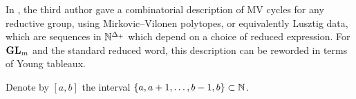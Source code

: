 \documentclass{article} %
\begin{document}

% 

In \cite{kamnitzer2010mirkovic}, the third author gave a combinatorial description of MV cycles for any reductive group, using Mirkovic--Vilonen polytopes, or equivalently Lusztig data, which are sequences in $\mathbb N^{\Delta_+}$ which depend on a choice of reduced expression.  For ${\mathbf{GL}}_m$ and the standard reduced word, this description can be reworded in terms of Young tableaux. 


Denote by $[a,b]$ the interval $\{a,a+1,\dots,b-1,b\}\subset\mathbb N$. 
\end{document}
